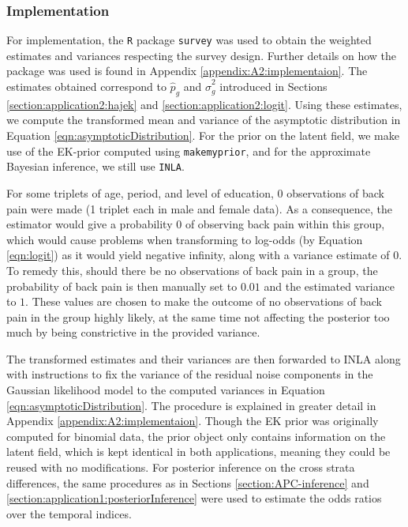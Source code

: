 \subsubsection{Implementation}
\label{section:application2:implementation}
For implementation, the \texttt{R} package \texttt{survey} was used to obtain the weighted estimates and variances respecting the survey design. Further details on how the package was used is found in Appendix \ref{appendix:A2:implementaion}. The estimates obtained correspond to $\hat{p}_g$ and $\hat{\sigma}_g^2$ introduced in Sections \ref{section:application2:hajek} and \ref{section:application2:logit}. Using these estimates, we compute the transformed mean and variance of the asymptotic distribution in Equation \eqref{eqn:asymptoticDistribution}. For the prior on the latent field, we make use of the EK-prior computed using \texttt{makemyprior}, and for the approximate Bayesian inference, we still use \texttt{INLA}.

For some triplets of age, period, and level of education, $0$ observations of back pain were made (1 triplet each in male and female data). As a consequence, the estimator would give a probability $0$ of observing back pain within this group, which would cause problems when transforming to log-odds (by Equation \eqref{eqn:logit}) as it would yield negative infinity, along with a variance estimate of $0$. To remedy this, should there be no observations of back pain in a group, the probability of back pain is then manually set to $0.01$ and the estimated variance to $1$. These values are chosen to make the outcome of no observations of back pain in the group highly likely, at the same time not affecting the posterior too much by being constrictive in the provided variance.

The transformed estimates and their variances are then forwarded to INLA along with instructions to fix the variance of the residual noise components in the Gaussian likelihood model to the computed variances in Equation \eqref{eqn:asymptoticDistribution}. The procedure is explained in greater detail in Appendix \ref{appendix:A2:implementaion}. Though the EK prior was originally computed for binomial data, the prior object only contains information on the latent field, which is kept identical in both applications, meaning they could be reused with no modifications. For posterior inference on the cross strata differences, the same procedures as in Sections \ref{section:APC-inference} and \ref{section:application1:posteriorInference} were used to estimate the odds ratios over the temporal indices.

